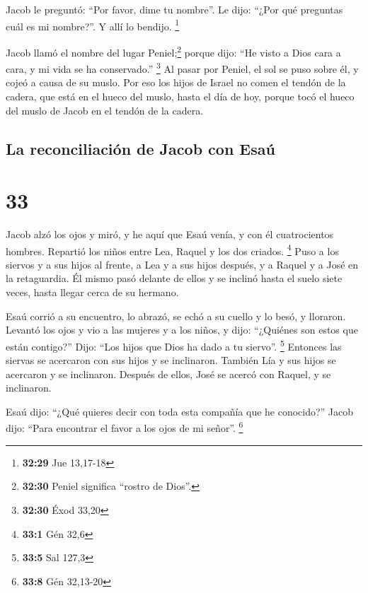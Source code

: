  Jacob le preguntó: ``Por favor, dime tu nombre''. Le
dijo: ``¿Por qué preguntas cuál es mi nombre?''. Y allí lo bendijo.
\footnote{\textbf{32:29} Jue 13,17-18}

 Jacob llamó el nombre del lugar Peniel;\footnote{\textbf{32:30}
  Peniel significa ``rostro de Dios''.} porque dijo: ``He visto a Dios
cara a cara, y mi vida se ha conservado.'' \footnote{\textbf{32:30} Éxod
  33,20}  Al pasar por Peniel, el sol se puso sobre él, y
cojeó a causa de su muslo.  Por eso los hijos de Israel
no comen el tendón de la cadera, que está en el hueco del muslo, hasta
el día de hoy, porque tocó el hueco del muslo de Jacob en el tendón de
la cadera.

\hypertarget{la-reconciliaciuxf3n-de-jacob-con-esauxfa}{%
\subsection{La reconciliación de Jacob con
Esaú}\label{la-reconciliaciuxf3n-de-jacob-con-esauxfa}}

\hypertarget{section-32}{%
\section{33}\label{section-32}}

 Jacob alzó los ojos y miró, y he aquí que Esaú venía, y
con él cuatrocientos hombres. Repartió los niños entre Lea, Raquel y los
dos criados. \footnote{\textbf{33:1} Gén 32,6}  Puso a los
siervos y a sus hijos al frente, a Lea y a sus hijos después, y a Raquel
y a José en la retaguardia.  Él mismo pasó delante de
ellos y se inclinó hasta el suelo siete veces, hasta llegar cerca de su
hermano.

 Esaú corrió a su encuentro, lo abrazó, se echó a su
cuello y lo besó, y lloraron.  Levantó los ojos y vio a
las mujeres y a los niños, y dijo: ``¿Quiénes son estos que están
contigo?'' Dijo: ``Los hijos que Dios ha dado a tu siervo''. \footnote{\textbf{33:5}
  Sal 127,3}  Entonces las siervas se acercaron con sus
hijos y se inclinaron.  También Lía y sus hijos se
acercaron y se inclinaron. Después de ellos, José se acercó con Raquel,
y se inclinaron.

 Esaú dijo: ``¿Qué quieres decir con toda esta compañía
que he conocido?'' Jacob dijo: ``Para encontrar el favor a los ojos de
mi señor''. \footnote{\textbf{33:8} Gén 32,13-20}

